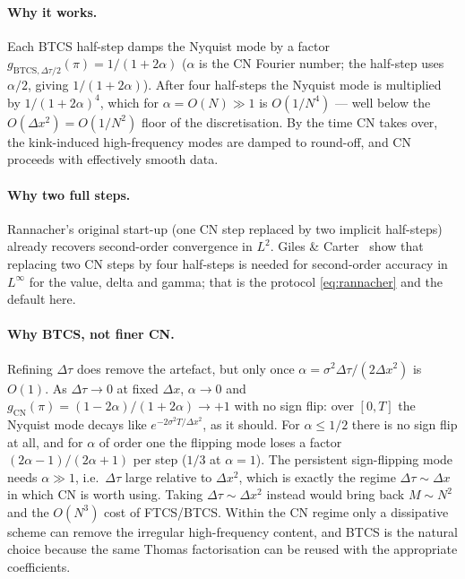 \documentclass[11pt,a4paper]{article}
\begin{document}
\paragraph{Why it works.} Each BTCS half-step damps the Nyquist mode
by a factor $g_{\mathrm{BTCS},\Delta\tau/2}(\pi) = 1/(1 + 2\alpha)$
($\alpha$ is the CN Fourier number; the half-step uses $\alpha/2$,
giving $1/(1 + 2\alpha)$). After four half-steps the Nyquist mode is
multiplied by $1/(1+2\alpha)^4$, which for $\alpha = O(N) \gg 1$ is
$O(1/N^4)$ --- well below the $O(\Delta x^2) = O(1/N^2)$ floor of the
discretisation. By the time CN takes over, the kink-induced
high-frequency modes are damped to round-off, and CN proceeds with
effectively smooth data.

\paragraph{Why two full steps.} Rannacher's original start-up (one CN
step replaced by two implicit half-steps) already recovers
second-order convergence in $L^2$. Giles \&
Carter~\cite{GilesCarter2006} show that replacing two CN steps by four
half-steps is needed for second-order accuracy in $L^\infty$ for the
value, delta and gamma; that is the protocol \eqref{eq:rannacher} and
the default here.

\paragraph{Why BTCS, not finer CN.} Refining $\Delta\tau$ does remove
the artefact, but only once $\alpha = \sigma^2\Delta\tau/(2\Delta x^2)$
is $O(1)$. As $\Delta\tau \to 0$ at fixed $\Delta x$, $\alpha \to 0$
and $g_{\mathrm{CN}}(\pi) = (1 - 2\alpha)/(1 + 2\alpha) \to +1$ with no
sign flip: over $[0, T]$ the Nyquist mode decays like
$e^{-2\sigma^2 T/\Delta x^2}$, as it should. For $\alpha \le 1/2$ there
is no sign flip at all, and for $\alpha$ of order one the flipping mode
loses a factor $(2\alpha - 1)/(2\alpha + 1)$ per step ($1/3$ at
$\alpha = 1$). The persistent sign-flipping mode
needs $\alpha \gg 1$, i.e.\ $\Delta\tau$ large relative to $\Delta x^2$,
which is exactly the regime $\Delta\tau \sim \Delta x$ in which CN is
worth using. Taking $\Delta\tau \sim \Delta x^2$ instead would bring back
$M \sim N^2$ and the $O(N^3)$ cost of FTCS/BTCS. Within the CN regime
only a dissipative scheme can remove the irregular high-frequency
content, and BTCS is the natural choice because the same Thomas
factorisation can be reused with the appropriate coefficients.
\end{document}
